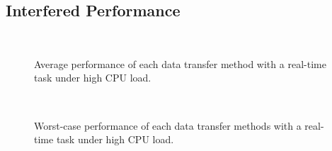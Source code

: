 \subsection{Interfered Performance}
\label{sec:interfered_performance}

\begin{figure}[!t]
 \begin{center}
  \\
  \caption{Average performance of each data transfer method with a
  real-time task under high CPU load.}
  \label{fig:average_realtime_cpuload}
 \end{center}
\end{figure}
\begin{figure}
 \begin{center}
  \\
  \caption{Worst-case performance of each data transfer methods with a
  real-time task under high CPU load.}
  \label{fig:worst_realtime_cpuload}
  \end{center}
\end{figure}

